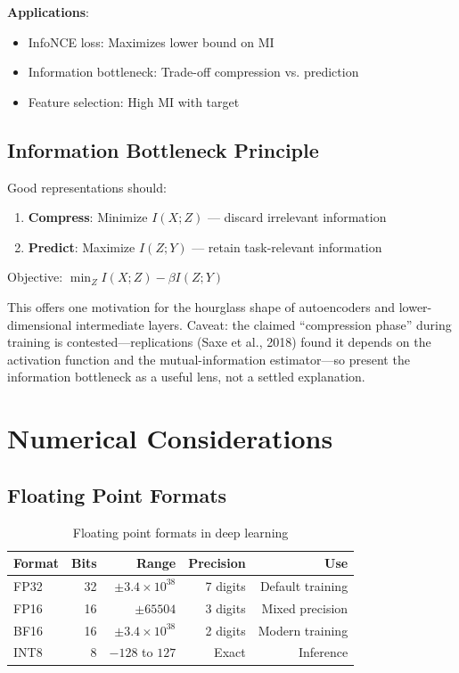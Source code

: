 \textbf{Applications}:
\begin{itemize}
    \item InfoNCE loss: Maximizes lower bound on MI
    \item Information bottleneck: Trade-off compression vs. prediction
    \item Feature selection: High MI with target
\end{itemize}

\subsection{Information Bottleneck Principle}

\begin{keyinsight}
Good representations should:
\begin{enumerate}
    \item \textbf{Compress}: Minimize $I(X; Z)$ --- discard irrelevant information
    \item \textbf{Predict}: Maximize $I(Z; Y)$ --- retain task-relevant information
\end{enumerate}

Objective: $\min_Z I(X; Z) - \beta I(Z; Y)$
\end{keyinsight}

This offers one motivation for the hourglass shape of autoencoders and lower-dimensional intermediate layers. Caveat: the claimed ``compression phase'' during training is contested---replications (Saxe et al., 2018) found it depends on the activation function and the mutual-information estimator---so present the information bottleneck as a useful lens, not a settled explanation.

\section{Numerical Considerations}
\label{sec:numerical}

\subsection{Floating Point Formats}

\begin{table}[H]
\centering
\caption{Floating point formats in deep learning}
\begin{tabular}{lrrrr}
\toprule
\textbf{Format} & \textbf{Bits} & \textbf{Range} & \textbf{Precision} & \textbf{Use} \\
\midrule
FP32 & 32 & $\pm 3.4 \times 10^{38}$ & ~7 digits & Default training \\
FP16 & 16 & $\pm 65504$ & ~3 digits & Mixed precision \\
BF16 & 16 & $\pm 3.4 \times 10^{38}$ & ~2 digits & Modern training \\
INT8 & 8 & $-128$ to $127$ & Exact & Inference \\
\bottomrule
\end{tabular}
\end{table}

